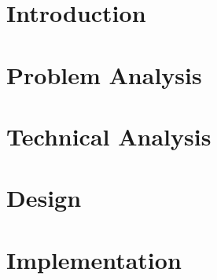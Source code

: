 \documentclass[11pt,twoside,titlepage]{report}
\begin{document}
\lhead[\fancyplain{}{\textit{\leftmark}}]{}
\rhead[]{\fancyplain{}{\textit{\leftmark}}}

\thispagestyle{empty}
\newpage
\cleardoublepage
\newpage
\thispagestyle{empty}


\newpage
\thispagestyle{empty}


\cleardoublepage
{}
\renewcommand{\thepage}{\arabic{page}}%
\thispagestyle{empty}
\tableofcontents
\printglossary[type=\acronymtype,nogroupskip,nonumberlist,title=Abbreviations]
\clearpage{\pagestyle{empty}\cleardoublepage}


\chapter{Introduction}
\label{sec:intro}

\chapter{Problem Analysis} \label{chap:problemanalysis}





\chapter{Technical Analysis}

%




\chapter{Design}


\chapter{Implementation}



\end{document}
